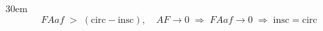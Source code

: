 \documentclass[border=4pt]{standalone}
\begin{document}
\begin{varwidth}{30em}
\large
\[ FAaf \;>\; (\text{circ}-\text{insc}), \quad AF\to0 \;\Rightarrow\; FAaf\to0 \;\Rightarrow\; \text{insc}=\text{circ} \]

\end{varwidth}
\end{document}
